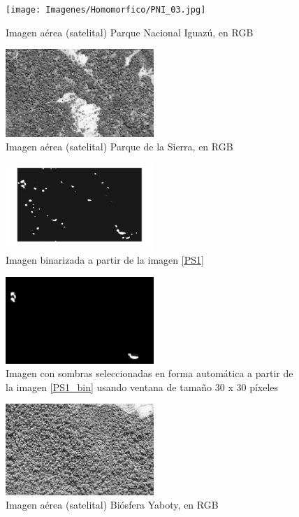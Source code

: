\begin{figure}[h!]
    \texttt{[image: Imagenes/Homomorfico/PNI\_03.jpg]}
     \hfill
     \caption{Imagen aérea (satelital) Parque Nacional Iguazú, en RGB}
\end{figure}

\begin{figure}[h!]
    \includegraphics[width=0.5\textwidth]{Imagenes/Homomorfico/PS1_original.jpg}
     \hfill
     \caption{Imagen aérea (satelital) Parque de la Sierra, en RGB}
\end{figure}
\begin{figure}[h!]
    \includegraphics[width=0.5\textwidth]{Imagenes/Homomorfico/PS1_bin.png}
     \hfill
     \caption{Imagen binarizada a partir de la imagen \ref{PS1}}
\end{figure}
\begin{figure}[h!]
    \includegraphics[width=0.5\textwidth]{Imagenes/Homomorfico/PS1_masked_30.png}
     \hfill
     \caption{Imagen con sombras seleccionadas en forma automática a partir de la imagen \ref{PS1_bin} usando ventana de tamaño 30 x 30 píxeles}
\end{figure}
\begin{figure}[h!]
    \includegraphics[width=0.5\textwidth]{Imagenes/Homomorfico/YB1.jpg}
     \hfill
     \caption{Imagen aérea (satelital) Biósfera Yaboty, en RGB}
\end{figure}
